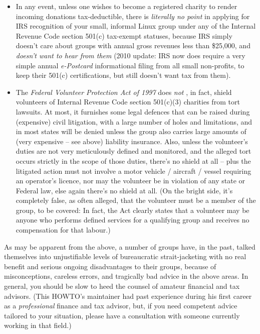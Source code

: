 \begin{itemize}
\item In any event, unless one wishes to become a registered charity to render incoming donations tax-deductible, there is {\itshape literally no point\/} in applying for  IRS  recognition of your small, informal Linux group under any of the Internal Revenue Code section 501(c) tax-exempt statuses, because IRS simply doesn't care about groups with annual gross revenues less than \$25,000, and 
\emph{doesn't want to hear from them} \texttt{\aeourl}
  (2010 update:  IRS now does require a very simple annual 
\emph{e-Postcard} \texttt{\aepurl}
 informational filing from all small non-profits, to keep their 501(c) certifications, but still doesn't want tax from them).

\item The 
\emph{Federal Volunteer Protection Act of 1997} \texttt{\aequrl}
 does 
\emph{not} \texttt{\aerurl}
, in fact, shield volunteers of Internal Revenue Code section 501(c)(3) charities from tort lawsuits.  At most, it furnishes some legal defences that can be raised during (expensive) civil litigation, with a large number of holes and limitations, and in most states will be denied unless the group also carries large amounts of (very expensive -- see above) liability insurance.  Also, unless the volunteer's duties are not very meticulously defined and monitored, and the alleged tort occurs strictly in the scope of those duties, there's no shield at all -- plus the litigated action must not involve a motor vehicle / aircraft / vessel requiring an operator's licence, nor may the volunteer be in violation of any state or Federal law, else again there's no shield at all.  (On the bright side, it's completely false, as often alleged, that the volunteer must be a member of the group, to be covered:  In fact, the Act clearly states that a volunteer may be anyone who performs defined services for a qualifying group and receives no compensation for that labour.)

\end{itemize}


As may be apparent from the above, a number of groups have, in the past, talked themselves into unjustifiable levels of bureaucratic strait-jacketing with no real benefit and serious ongoing disadvantages to their groups, because of misconceptions, careless errors, and tragically bad advice in the above areas.  In general, you should be slow to heed the counsel of amateur financial and tax advisors.  (This HOWTO's maintainer had past experience during his first career as a {\itshape professional\/} finance and tax advisor, but, if you need competent advice tailored to your situation, please have a consultation with someone currently working in that field.)





